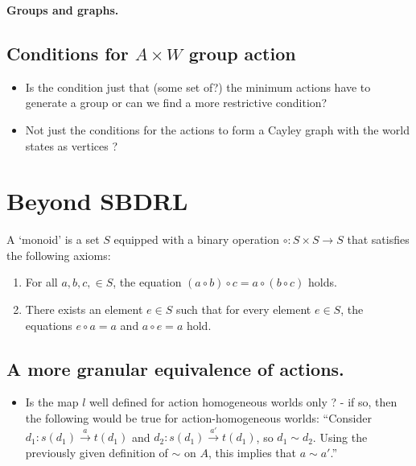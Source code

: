 \textbf{Groups and graphs.}

\subsection{Conditions for $A \times W$ group action}

\begin{itemize}
    \item Is the condition just that (some set of?) the minimum actions have to generate a group or can we find a more restrictive condition?
    
    \item Not just the conditions for the actions to form a Cayley graph with the world states as vertices ?
\end{itemize}


\section{Beyond SBDRL}

\begin{definition}[Monoid]
    A `monoid' is a set $S$ equipped with a binary operation $\circ: S \times S \to S$ that satisfies the following axioms:
    \begin{enumerate}
        \item For all $a,b,c, \in S$, the equation $(a \circ b) \circ c = a \circ (b \circ c)$ holds.
        \item There exists an element $e \in S$ such that for every element $e \in S$, the equations $e \circ a = a$ and $a \circ e = a$ hold.
    \end{enumerate}
\end{definition}


\subsection{A more granular equivalence of actions.}

\begin{itemize}
    \item Is the map $l$ well defined for action homogeneous worlds only ? - if so, then the following would be true for action-homogeneous worlds: ``Consider $d_{1}: s(d_{1}) \xrightarrow{a} t(d_{1})$ and $d_{2}: s(d_{1}) \xrightarrow{a'} t(d_{1})$, so $d_{1} \sim d_{2}$.
    Using the previously given definition of $\sim$ on $A$, this implies that $a \sim a'$.''
\end{itemize}

